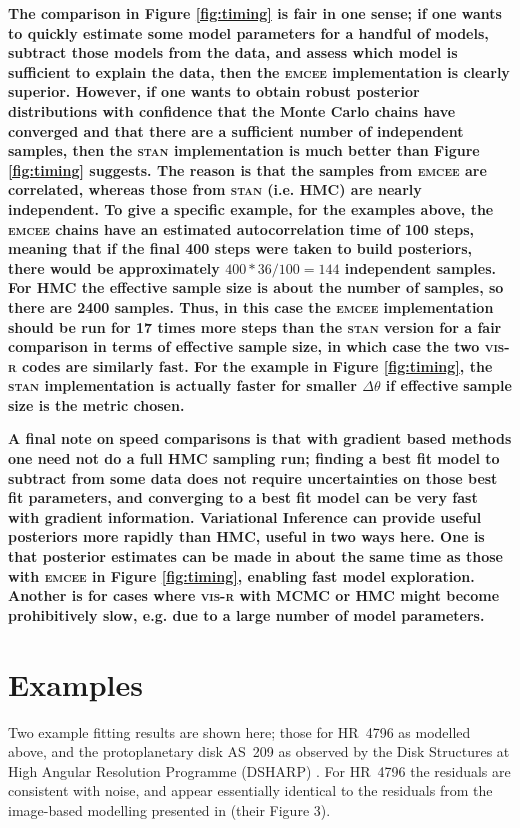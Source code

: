 \documentclass[fleqn,usenatbib]{mnras}
\begin{document}
\textbf{The comparison in Figure \ref{fig:timing} is fair in one sense; if one wants to quickly estimate some model parameters for a handful of models, subtract those models from the data, and assess which model is sufficient to explain the data, then the \textsc{emcee} implementation is clearly superior. However, if one wants to obtain robust posterior distributions with confidence that the Monte Carlo chains have converged and that there are a sufficient number of independent samples, then the \textsc{stan} implementation is much better than Figure \ref{fig:timing} suggests. The reason is that the samples from \textsc{emcee} are correlated, whereas those from \textsc{stan} (i.e. HMC) are nearly independent. To give a specific example, for the examples above, the \textsc{emcee} chains have an estimated autocorrelation time of 100 steps, meaning that if the final 400 steps were taken to build posteriors, there would be approximately $400*36/100=144$ independent samples. For HMC the effective sample size is about the number of samples, so there are 2400 samples. Thus, in this case the \textsc{emcee} implementation should be run for 17 times more steps than the \textsc{stan} version for a fair comparison in terms of effective sample size, in which case the two \textsc{vis-r} codes are similarly fast. For the example in Figure \ref{fig:timing}, the \textsc{stan} implementation is actually faster for smaller $\Delta \theta$ if effective sample size is the metric chosen.}

\textbf{A final note on speed comparisons is that with gradient based methods one need not do a full HMC sampling run; finding a best fit model to subtract from some data does not require uncertainties on those best fit parameters, and converging to a best fit model can be very fast with gradient information. Variational Inference can provide useful posteriors more rapidly than HMC, useful in two ways here. One is that posterior estimates can be made in about the same time as those with \textsc{emcee} in Figure \ref{fig:timing}, enabling fast model exploration. Another is for cases where \textsc{vis-r} with MCMC or HMC might become prohibitively slow, e.g. due to a large number of model parameters.}

\section{Examples}

Two example fitting results are shown here; those for HR~4796 as modelled above, and the protoplanetary disk AS~209 as observed by the Disk Structures at High Angular Resolution Programme (DSHARP) \citep{2018ApJ...869L..48G}. For HR~4796 the residuals are consistent with noise, and appear essentially identical to the residuals from the image-based modelling presented in \citet{2018MNRAS.475.4924K} (their Figure 3).
\end{document}
